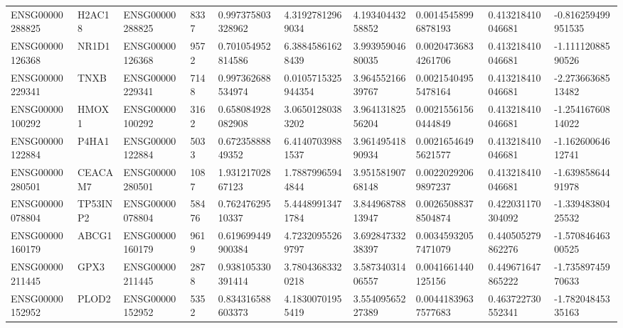 \begin{tabular}{@{}llllllllll@{}}
ENSG00000288825 & H2AC18 & ENSG00000288825 & 8337 & 0.997375803328962 & 4.31927812969034 & 4.19340443258852 & 0.00145458996878193 & 0.413218410046681 & -0.816259499951535 \\
ENSG00000126368 & NR1D1 & ENSG00000126368 & 9572 & 0.701054952814586 & 6.38845861628439 & 3.99395904680035 & 0.00204736834261706 & 0.413218410046681 & -1.11112088590526 \\
ENSG00000229341 & TNXB & ENSG00000229341 & 7148 & 0.997362688534974 & 0.0105715325944354 & 3.96455216639767 & 0.00215404955478164 & 0.413218410046681 & -2.27366368513482 \\
ENSG00000100292 & HMOX1 & ENSG00000100292 & 3162 & 0.658084928082908 & 3.06501280383202 & 3.96413182556204 & 0.00215561560444849 & 0.413218410046681 & -1.25416760814022 \\
ENSG00000122884 & P4HA1 & ENSG00000122884 & 5033 & 0.67235888849352 & 6.41407039881537 & 3.96149541890934 & 0.00216546495621577 & 0.413218410046681 & -1.16260064612741 \\
ENSG00000280501 & CEACAM7 & ENSG00000280501 & 1087 & 1.93121702867123 & 1.78879965944844 & 3.95158190768148 & 0.00220292069897237 & 0.413218410046681 & -1.63985864491978 \\
ENSG00000078804 & TP53INP2 & ENSG00000078804 & 58476 & 0.76247629510337 & 5.44489913471784 & 3.84496878813947 & 0.00265088378504874 & 0.422031170304092 & -1.33948380425532 \\
ENSG00000160179 & ABCG1 & ENSG00000160179 & 9619 & 0.619699449900384 & 4.72320955269797 & 3.69284733238397 & 0.00345932057471079 & 0.440505279862276 & -1.57084646300525 \\
ENSG00000211445 & GPX3 & ENSG00000211445 & 2878 & 0.938105330391414 & 3.78043683320218 & 3.58734031406557 & 0.0041661440125156 & 0.449671647865222 & -1.73589745970633 \\
ENSG00000152952 & PLOD2 & ENSG00000152952 & 5352 & 0.834316588603373 & 4.18300701955419 & 3.55409565227389 & 0.00441839637577683 & 0.463722730552341 & -1.78204845335163 \\
\bottomrule
\end{tabular}
\endgroup

